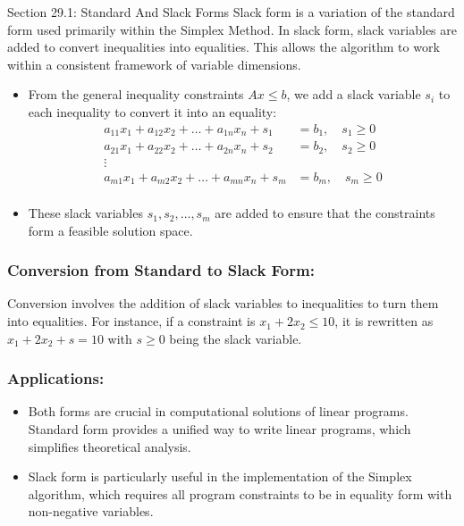 \begin{notes}{Section 29.1: Standard And Slack Forms}
    Slack form is a variation of the standard form used primarily within the Simplex Method. In slack form, slack variables are added to convert inequalities into equalities. This allows the algorithm 
    to work within a consistent framework of variable dimensions.
    
    \begin{itemize}
        \item From the general inequality constraints $Ax \leq b$, we add a slack variable $s_i$ to each inequality to convert it into an equality:
        \begin{align*}
        a_{11}x_1 + a_{12}x_2 + \ldots + a_{1n}x_n + s_1 &= b_1, \quad s_1 \geq 0\\
        a_{21}x_1 + a_{22}x_2 + \ldots + a_{2n}x_n + s_2 &= b_2, \quad s_2 \geq 0\\
        \vdots \\
        a_{m1}x_1 + a_{m2}x_2 + \ldots + a_{mn}x_n + s_m &= b_m, \quad s_m \geq 0\\
        \end{align*}
        \item These slack variables $s_1, s_2, \ldots, s_m$ are added to ensure that the constraints form a feasible solution space.
    \end{itemize}
    
    \subsubsection*{Conversion from Standard to Slack Form:}
    
    Conversion involves the addition of slack variables to inequalities to turn them into equalities. For instance, if a constraint is $x_1 + 2x_2 \leq 10$, it is rewritten as $x_1 + 2x_2 + s = 10$ 
    with $s \geq 0$ being the slack variable.
    
    \subsubsection*{Applications:}
    
    \begin{itemize}
        \item Both forms are crucial in computational solutions of linear programs. Standard form provides a unified way to write linear programs, which simplifies theoretical analysis.
        \item Slack form is particularly useful in the implementation of the Simplex algorithm, which requires all program constraints to be in equality form with non-negative variables.
    \end{itemize}    
\end{notes}

